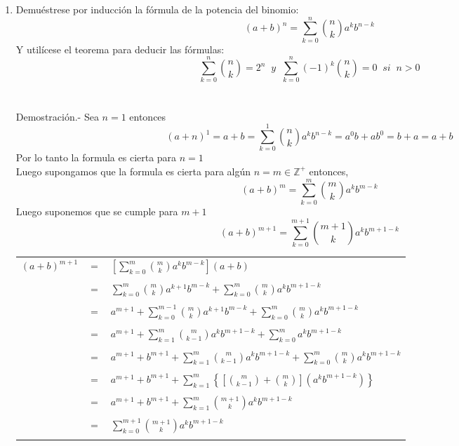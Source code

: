 \begin{enumerate}[ \bfseries 1.]
\item Demuéstrese por inducción la fórmula de la potencia del binomio:
$$(a+b)^n = \displaystyle\sum_{k=0}^n {n \choose k} a^k b^{n-k}$$
Y utilícese el teorema para deducir las fórmulas:
$$\displaystyle\sum_{k=0}^n {n \choose k} = 2^n \; \; y \; \; \sum_{k=0}^n (-1)^k {n \choose k} = 0 \; \; si \; \; n>0$$\\\\
Demostración.- \; Sea $n=1$ entonces $$(a+n)^1 = a + b = \sum\limits_{k=0}^1 {n \choose k} a^k b^{n-k} = a^0 b + a b^0 = b + a = a + b$$
Por lo tanto la formula es cierta para $n=1$\\ 
Luego supongamos que la formula es cierta para algún $n=m \in \mathbb{Z}^+$ entonces,
$$(a+b)^m = \sum\limits_{k=0}^m {m \choose k} a^k b^{m-k}$$ Luego suponemos que se cumple para $m+1$
$$(a+b)^{m+1} = \sum\limits_{k=0}^{m+1} {m+1 \choose k} a^k b^{m+1-k}$$
\begin{center}
\begin{tabular}{r c l}
$(a+b)^{m+1}$&$=$&$\left[ \sum\limits_{k=0}^m {m \choose k} a^k b^{m-k} \right] (a+b)$\\\\
&$=$&$\sum\limits_{k=0}^m {m \choose k} a^{k+1} b^{m-k} + \sum\limits_{k=0}^m {m \choose k}a^k b^{m+1-k}$\\\\
&$=$&$a^{m+1} + \sum\limits_{k=0}^{m-1} {m \choose k} a^{k+1} b^{m-k} + \sum\limits_{k=0}^m {m \choose k}a^k b^{m+1-k}$\\\\
&$=$&$a^{m+1} + \sum\limits_{k=1}^{m} {m \choose k-1} a^k b^{m+1-k} + \sum\limits_{k=0}^{m} a^k b^{m+1-k}$\\\\
&$=$&$a^{m+1} + b^{m+1} + \sum\limits_{k=1}^{m} {m \choose k-1} a^k b^{m+1-k} + \sum\limits_{k=0}^m {m \choose k} a^k b^{m+1-k}$\\\\
&$=$&$a^{m+1} + b^{m+1} + \sum\limits_{k=1}^m \left\lbrace \left[ {m \choose k-1} + {m \choose k} \right] \left( a^k b^{m+1-k} \right)\right\rbrace$\\\\
&$=$&$a^{m+1} + b^{m+1} + \sum_{k=1}^m {m+1 \choose k} a^k b^{m+1-k}$\\\\
&$=$&$\sum\limits_{k=0}^{m+1} {m+1 \choose k} a^k b^{m+1-k}$\\\\

\end{tabular}
\end{center}
\end{enumerate}
